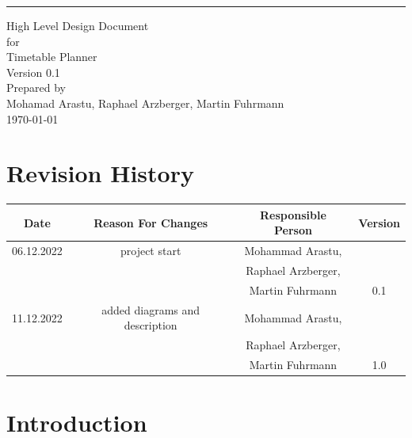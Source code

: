 \documentclass{scrreprt}
\date{}
\def\myversion{0.1}
\begin{document}
	
	\begin{flushright}
		\rule{16cm}{5pt}\vskip1cm
		\begin{bfseries}
			\Huge{High Level Design Document}\\
			\vspace{1.9cm}
			for\\
			\vspace{1.9cm}
			Timetable Planner\\
			\vspace{1.9cm}
			\LARGE{Version \myversion}\\
			\vspace{1.9cm}
			Prepared by \\ {\small Mohamad Arastu, Raphael Arzberger, Martin Fuhrmann}
			\vspace{1.9cm} \\
			\today\\
		\end{bfseries}
	\end{flushright}
	
	\tableofcontents
	
	
	\chapter*{Revision History}
	
	\begin{center}
		\begin{tabular}{|c|c|c|c|}
			\hline
			Date & Reason For Changes & Responsible Person & Version\\
			\hline
			06.12.2022 & project start & Mohammad Arastu, & \\&&Raphael Arzberger, & \\&&Martin Fuhrmann & 0.1\\
			\hline
			11.12.2022 & added diagrams and description & Mohammad Arastu, & \\&&Raphael Arzberger, & \\&&Martin Fuhrmann & 1.0\\
			\hline
		\end{tabular}
	\end{center}
	
	\chapter{Introduction}
	
\end{document}
